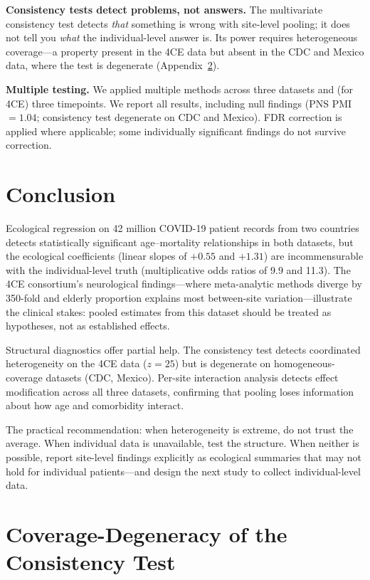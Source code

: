 \documentclass[11pt]{article}
\begin{document}
\textbf{Consistency tests detect problems, not answers.}  The multivariate
consistency test detects \emph{that} something is wrong with site-level
pooling; it does not tell you \emph{what} the individual-level answer is.
Its power requires heterogeneous coverage---a property present in the 4CE
data but absent in the CDC and Mexico data, where the test is degenerate
(Appendix~\ref{app:degeneracy}).

\textbf{Multiple testing.}  We applied multiple methods across three
datasets and (for 4CE) three timepoints.  We report all results, including
null findings (PNS PMI $= 1.04$; consistency test degenerate on CDC and
Mexico).  FDR correction is applied where applicable; some individually
significant findings do not survive correction.


\section{Conclusion}

Ecological regression on 42 million COVID-19 patient records from two
countries detects statistically significant age--mortality relationships in
both datasets, but the ecological coefficients (linear slopes of $+0.55$
and $+1.31$) are incommensurable with the individual-level truth
(multiplicative odds ratios of 9.9 and 11.3).  The 4CE consortium's
neurological findings---where meta-analytic methods diverge by 350-fold
and elderly proportion explains most between-site variation---illustrate
the clinical stakes: pooled estimates from this dataset should be treated
as hypotheses, not as established effects.

Structural diagnostics offer partial help.  The consistency test detects
coordinated heterogeneity on the 4CE data ($z = 25$) but is degenerate on
homogeneous-coverage datasets (CDC, Mexico).  Per-site interaction analysis
detects effect modification across all three datasets, confirming that
pooling loses information about how age and comorbidity interact.

The practical recommendation: when heterogeneity is extreme, do not trust the
average.  When individual data is unavailable, test the structure.  When
neither is possible, report site-level findings explicitly as ecological
summaries that may not hold for individual patients---and design the next
study to collect individual-level data.


\appendix

\section{Coverage-Degeneracy of the Consistency Test}
\label{app:degeneracy}
\end{document}
